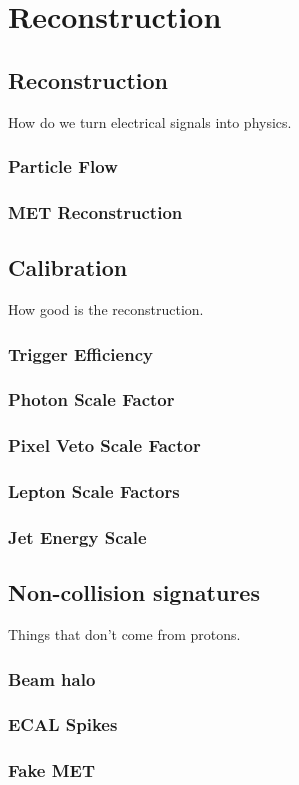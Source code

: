 \chapter{Reconstruction}

\section{Reconstruction}

How do we turn electrical signals into physics.

\subsection{Particle Flow}

\subsection{MET Reconstruction}

\section{Calibration}

How good is the reconstruction.

\subsection{Trigger Efficiency}

\subsection{Photon Scale Factor}

\subsection{Pixel Veto Scale Factor}

\subsection{Lepton Scale Factors}

\subsection{Jet Energy Scale}

\section{Non-collision signatures}

Things that don't come from protons.

\subsection{Beam halo}

\subsection{ECAL Spikes}

\subsection{Fake MET}
